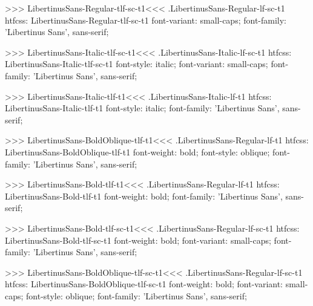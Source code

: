 {{{{>>>
\<LibertinusSans-Regular-tlf-sc-t1\><<<
.LibertinusSans-Regular-lf-sc-t1
htfcss:  LibertinusSans-Regular-tlf-sc-t1  font-variant: small-caps; font-family: 'Libertinus Sans', sans-serif;

>>>
\<LibertinusSans-Italic-tlf-sc-t1\><<<
.LibertinusSans-Italic-lf-sc-t1
htfcss:  LibertinusSans-Italic-tlf-sc-t1  font-style: italic; font-variant: small-caps; font-family: 'Libertinus Sans', sans-serif;

>>>
\<LibertinusSans-Italic-tlf-t1\><<<
.LibertinusSans-Italic-lf-t1
htfcss:  LibertinusSans-Italic-tlf-t1  font-style: italic; font-family: 'Libertinus Sans', sans-serif;

>>>
\<LibertinusSans-BoldOblique-tlf-t1\><<<
.LibertinusSans-Regular-lf-t1
htfcss:  LibertinusSans-BoldOblique-tlf-t1  font-weight: bold; font-style: oblique; font-family: 'Libertinus Sans', sans-serif;

>>>
\<LibertinusSans-Bold-tlf-t1\><<<
.LibertinusSans-Regular-lf-t1
htfcss:  LibertinusSans-Bold-tlf-t1  font-weight: bold; font-family: 'Libertinus Sans', sans-serif;

>>>
\<LibertinusSans-Bold-tlf-sc-t1\><<<
.LibertinusSans-Regular-lf-sc-t1
htfcss:  LibertinusSans-Bold-tlf-sc-t1  font-weight: bold; font-variant: small-caps; font-family: 'Libertinus Sans', sans-serif;

>>>
\<LibertinusSans-BoldOblique-tlf-sc-t1\><<<
.LibertinusSans-Regular-lf-sc-t1
htfcss:  LibertinusSans-BoldOblique-tlf-sc-t1  font-weight: bold; font-variant: small-caps; font-style: oblique; font-family: 'Libertinus Sans', sans-serif;

}}}}
